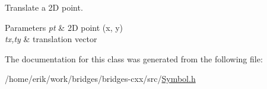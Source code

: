 Translate a 2D point. 


\begin{DoxyParams}{Parameters}
{\em pt} & 2D point (x, y) \\
\hline
{\em tx,ty} & translation vector \\
\hline
\end{DoxyParams}


The documentation for this class was generated from the following file\+:\begin{DoxyCompactItemize}
\item 
/home/erik/work/bridges/bridges-\/cxx/src/\hyperlink{_symbol_8h}{Symbol.\+h}\end{DoxyCompactItemize}
